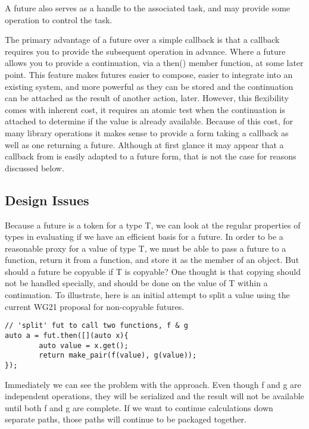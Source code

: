 A future also serves as a handle to the associated task, and may provide some operation to control the task.

The primary advantage of a future over a simple callback is that a callback requires you to provide the subsequent operation in advance. Where a future allows you to provide a continuation, via a then() member function, at some later point. This feature makes futures easier to compose, easier to integrate into an existing system, and more powerful as they can be stored and the continuation can be attached as the result of another action, later. However, this flexibility comes with inherent cost, it requires an atomic test when the continuation is attached to determine if the value is already available. Because of this cost, for many library operations it makes sense to provide a form taking a callback as well as one returning a future. Although at first glance it may appear that a callback from is easily adapted to a future form, that is not the case for reasons discussed below.

\subsection{Design Issues}

Because a future is a token for a type T, we can look at the regular properties of types in evaluating if we have an efficient basis for a future. In order to be a reasonable proxy for a value of type T, we must be able to pass a future to a function, return it from a function, and store it as the member of an object. But should a future be copyable if T is copyable? One thought is that copying should not be handled specially, and should be done on the value of T within a continuation. To illustrate, here is an initial attempt to split a value using the current WG21 proposal for non-copyable futures.

\begin{verbatim}
// 'split' fut to call two functions, f & g
auto a = fut.then([](auto x){
        auto value = x.get();
        return make_pair(f(value), g(value));
});
\end{verbatim}

Immediately we can see the problem with the approach. Even though f and g are independent operations, they will be serialized and the result will not be available until both f and g are complete. If we want to continue calculations down separate paths, those paths will continue to be packaged together.

